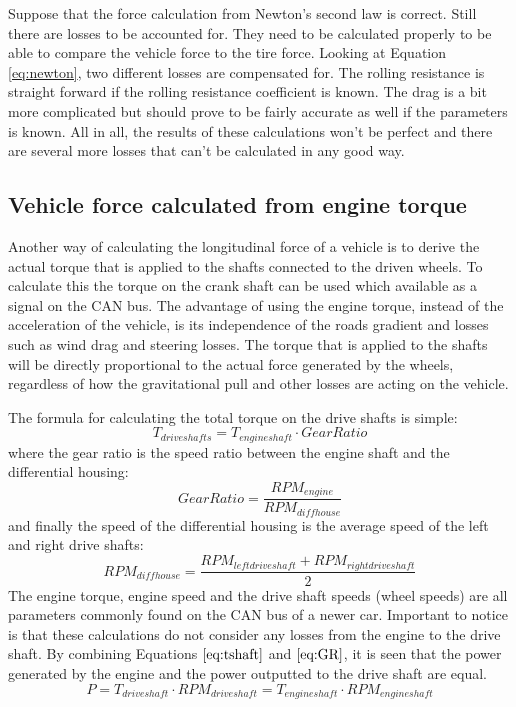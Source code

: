 Suppose that the force calculation from Newton's second law is correct. Still there are losses to be accounted for. They need to be calculated properly to be able to compare the vehicle force to the tire force. Looking at Equation \ref{eq:newton}, two different losses are compensated for. The rolling resistance is straight forward if the rolling resistance coefficient is known. The drag is a bit more complicated but should prove to be fairly accurate as well if the parameters is known. All in all, the results of these calculations won't be perfect and there are several more losses that can't be calculated in any good way.


\subsection{Vehicle force calculated from engine torque}
Another way of calculating the longitudinal force of a vehicle is to derive the actual torque that is applied to the shafts connected to the driven wheels. To calculate this the torque on the crank shaft can be used which available as a signal on the CAN bus. The advantage of using the engine torque, instead of the acceleration of the vehicle, is its independence of the roads gradient and losses such as wind drag and steering losses. The torque that is applied to the shafts will be directly proportional to the actual force generated by the wheels, regardless of how the gravitational pull and other losses are acting on the vehicle. 

The formula for calculating the total torque on the drive shafts is simple:
\begin{equation}
\label{eq:tshaft}
T_{driveshafts} = T_{engineshaft}\cdot GearRatio
\end{equation}
where the gear ratio is the speed ratio between the engine shaft and the differential housing:
\begin{equation}
\label{eq:GR}
Gear Ratio = \frac{RPM_{engine}}{RPM_{diffhouse}}
\end{equation}
and finally the speed of the differential housing is the average speed of the left and right drive shafts:
\begin{equation}
\label{eq:diffhouse}
RPM_{diffhouse} = \frac{RPM_{leftdriveshaft}+RPM_{rightdriveshaft}}{2}
\end{equation}
The engine torque, engine speed and the drive shaft speeds (wheel speeds) are all parameters commonly found on the CAN bus of a newer car. Important to notice is that these calculations do not consider any losses from the engine to the drive shaft. By combining Equations $ \ref{eq:tshaft} $ and $ \ref{eq:GR} $, it is seen that the power generated by the engine and the power outputted to the drive shaft are equal.
\begin{equation}
P = T_{driveshaft}\cdot RPM_{driveshaft} = T_{engineshaft}\cdot RPM_{engineshaft}
\end{equation}

